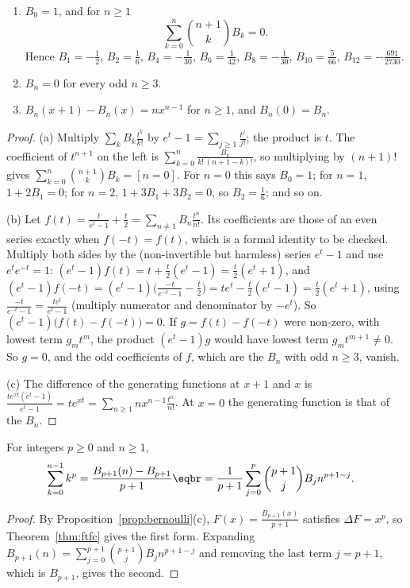 \begin{proposition}\label{prop:bernoulli}
\begin{enumerate}[label=(\alph*)]
\item $B_0=1$, and for $n\ge1$
\[
\sum_{k=0}^{n}\binom{n+1}kB_k=0.
\]
Hence $B_1=-\frac12$, $B_2=\frac16$, $B_4=-\frac1{30}$,
$B_6=\frac1{42}$, $B_8=-\frac1{30}$, $B_{10}=\frac5{66}$, $B_{12}=-\frac{691}{2730}$.
\item $B_n=0$ for every odd $n\ge3$.
\item $B_n(x+1)-B_n(x)=nx^{n-1}$ for $n\ge1$, and $B_n(0)=B_n$.
\end{enumerate}
\end{proposition}
\begin{proof}
(a) Multiply $\sum_kB_k\frac{t^k}{k!}$ by $e^t-1=\sum_{j\ge1}\frac{t^j}{j!}$; the product is $t$. The coefficient of $t^{n+1}$ on the
left is $\sum_{k=0}^n\frac{B_k}{k!\,(n+1-k)!}$, so multiplying by $(n+1)!$ gives $\sum_{k=0}^n\binom{n+1}kB_k=[n=0]$. For $n=0$
this says $B_0=1$; for $n=1$, $1+2B_1=0$; for $n=2$, $1+3B_1+3B_2=0$, so $B_2=\frac16$; and so on.

(b) Let $f(t)=\frac t{e^t-1}+\frac t2=\sum_{n\ne1}B_n\frac{t^n}{n!}$. Its coefficients are those of an even series exactly
when $f(-t)=f(t)$, which is a formal identity to be checked. Multiply both sides by the (non-invertible but harmless)
series $e^t-1$ and use $e^te^{-t}=1$: $(e^t-1)f(t)=t+\frac t2(e^t-1)=\frac t2(e^t+1)$, and
$(e^t-1)f(-t)=(e^t-1)\bigl(\frac{-t}{e^{-t}-1}-\frac t2\bigr)=te^t-\frac t2(e^t-1)=\frac t2(e^t+1)$, using
$\frac{-t}{e^{-t}-1}=\frac{te^t}{e^t-1}$ (multiply numerator and denominator by $-e^t$). So $(e^t-1)\bigl(f(t)-f(-t)\bigr)=0$.
If $g=f(t)-f(-t)$ were non-zero, with lowest term $g_mt^m$, the product $(e^t-1)g$ would have lowest term $g_mt^{m+1}\ne0$.
So $g=0$, and the odd coefficients of $f$, which are the $B_n$ with odd $n\ge3$, vanish.

(c) The difference of the generating functions at $x+1$ and $x$ is $\frac{te^{xt}(e^t-1)}{e^t-1}=te^{xt}=\sum_{n\ge1}nx^{n-1}\frac{t^n}{n!}$.
At $x=0$ the generating function is that of the $B_n$.
\end{proof}

\begin{theorem}\label{thm:faulhaber}
For integers $p\ge0$ and $n\ge1$,
\[
\begin{aligned}\sum_{k=0}^{n-1}k^p&=\frac{B_{p+1}(n)-B_{p+1}}{p+1}\eqbr=\frac1{p+1}\sum_{j=0}^p\binom{p+1}jB_jn^{p+1-j}.\end{aligned}
\]
\end{theorem}
\begin{proof}
By Proposition~\ref{prop:bernoulli}(c), $F(x)=\frac{B_{p+1}(x)}{p+1}$ satisfies $\Delta F=x^p$, so Theorem~\ref{thm:ftfc}
gives the first form. Expanding $B_{p+1}(n)=\sum_{j=0}^{p+1}\binom{p+1}jB_jn^{p+1-j}$ and removing the last term
$j=p+1$, which is $B_{p+1}$, gives the second.
\end{proof}

